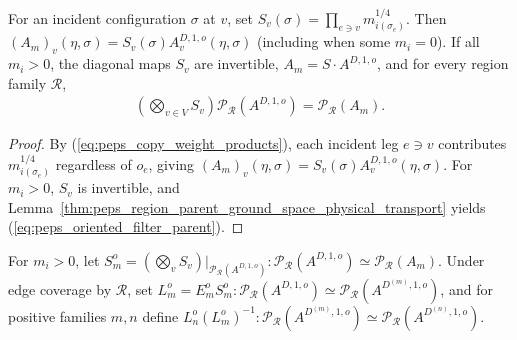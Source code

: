 \begin{lemma}%
    \label{thm:peps_oriented_copy_filter}
    \leanok
    For an incident configuration $\sigma$ at $v$, set $S_v(\sigma)=\prod_{e\ni v}m_{i(\sigma_e)}^{1/4}$. Then $(A_m)_v(\eta,\sigma)=S_v(\sigma)A^{D,1,o}_v(\eta,\sigma)$ (including when some $m_i=0$). If all $m_i>0$, the diagonal maps $S_v$ are invertible, $A_m=S\cdot A^{D,1,o}$, and for every region family $\mathcal R$,
    \begin{align}
        \left(\bigotimes_{v\in V}S_v\right)
        \mathcal P_{\mathcal R}(A^{D,1,o})
        =\mathcal P_{\mathcal R}(A_m).
        \label{eq:peps_oriented_filter_parent}
    \end{align}
\end{lemma}
\begin{proof}\leanok
    By (\ref{eq:peps_copy_weight_products}), each incident leg $e\ni v$ contributes $m_{i(\sigma_e)}^{1/4}$ regardless of $o_e$, giving $(A_m)_v(\eta,\sigma)=S_v(\sigma)A^{D,1,o}_v(\eta,\sigma)$. For $m_i>0$, $S_v$ is invertible, and Lemma~\ref{thm:peps_region_parent_ground_space_physical_transport} yields (\ref{eq:peps_oriented_filter_parent}).
\end{proof}

\begin{definition}%
    \label{def:peps_oriented_positive_multiplicity_equivalence}
    \leanok
    For $m_i>0$, let $S_m^o=(\bigotimes_vS_v)|_{\mathcal P_{\mathcal R}(A^{D,1,o})}:\mathcal P_{\mathcal R}(A^{D,1,o})\simeq\mathcal P_{\mathcal R}(A_m)$. Under edge coverage by $\mathcal R$, set $L_m^o=E_m^oS_m^o:\mathcal P_{\mathcal R}(A^{D,1,o})\simeq\mathcal P_{\mathcal R}(A^{D^{(m)},1,o})$, and for positive families $m,n$ define $L_n^o(L_m^o)^{-1}:\mathcal P_{\mathcal R}(A^{D^{(m)},1,o})\simeq\mathcal P_{\mathcal R}(A^{D^{(n)},1,o})$.
\end{definition}

